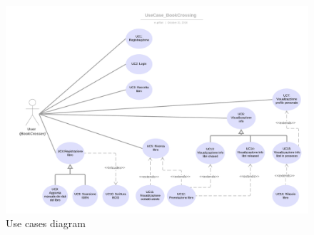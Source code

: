 \begin{figure}[h]
	\includegraphics[width=\textwidth]{Immagini/UseCase_BookCrossing}
	\caption{Use cases diagram}
	\label{fig:UsecasesDiagram}
\end{figure}
